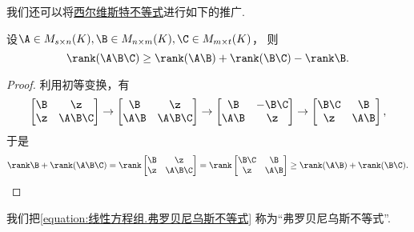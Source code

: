 我们还可以将\hyperref[equation:线性方程组.西尔维斯特不等式]{西尔维斯特不等式}进行如下的推广.
\begin{theorem}
设\(\A \in M_{s \times n}(K),
\B \in M_{n \times m}(K),
\C \in M_{m \times t}(K)\)，
则\begin{equation}\label{equation:线性方程组.弗罗贝尼乌斯不等式}
	\rank(\A\B\C) \geq \rank(\A\B) + \rank(\B\C) - \rank\B.
\end{equation}
\begin{proof}
利用初等变换，有\[
	\begin{bmatrix}
		\B & \z \\
		\z & \A\B\C
	\end{bmatrix}
	\to \begin{bmatrix}
		\B & \z \\
		\A\B & \A\B\C
	\end{bmatrix}
	\to \begin{bmatrix}
		\B & -\B\C \\
		\A\B & \z
	\end{bmatrix}
	\to \begin{bmatrix}
		\B\C & \B \\
		\z & \A\B
	\end{bmatrix},
\]
于是\[
	\rank\B + \rank(\A\B\C)
	= \rank\begin{bmatrix}
		\B & \z \\
		\z & \A\B\C
	\end{bmatrix}
	= \rank\begin{bmatrix}
		\B\C & \B \\
		\z & \A\B
	\end{bmatrix}
	\geq \rank(\A\B) + \rank(\B\C).
	\qedhere
\]
\end{proof}
\end{theorem}

我们把\cref{equation:线性方程组.弗罗贝尼乌斯不等式} 称为“弗罗贝尼乌斯不等式”.

